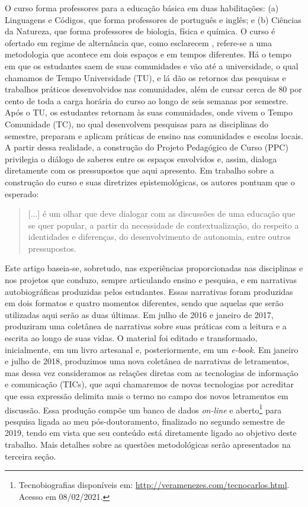 \documentclass{textolivre}
\begin{document}
O curso forma professores para a educação básica em duas habilitações: (a) Linguagens e Códigos, que forma professores de português e inglês; e (b) Ciências da Natureza, que forma professores de biologia, física e química. O curso é ofertado em regime de alternância que, como esclarecem \textcite{magnani_da_2018}, refere-se a uma metodologia que acontece em dois espaços e em tempos diferentes. Há o tempo em que os estudantes saem de suas comunidades e vão até a universidade, o qual chamamos de Tempo Universidade (TU), e lá dão os retornos das pesquisas e trabalhos práticos desenvolvidos nas comunidades, além de cursar cerca de 80 por cento de toda a carga horária do curso ao longo de seis semanas por semestre. Após o TU, os estudantes retornam às suas comunidades, onde vivem o Tempo Comunidade (TC), no qual desenvolvem pesquisas para as disciplinas do semestre, preparam e aplicam práticas de ensino nas comunidades e escolas locais. A partir dessa realidade, a construção do Projeto Pedagógico de Curso (PPC) privilegia o diálogo de saberes entre os espaços envolvidos e, assim, dialoga diretamente com os pressupostos que aqui apresento. Em trabalho sobre a construção do curso e suas diretrizes epistemológicas, os autores pontuam que o esperado:

\begin{quote}
    [...] é um olhar que deve dialogar com as discussões de uma educação que se quer popular, a partir da necessidade de contextualização, do respeito a identidades e diferenças, do desenvolvimento de autonomia, entre outros pressupostos. \cite[p. 67]{magnani_da_2018}
\end{quote}

Este artigo baseia-se, sobretudo, nas experiências proporcionadas nas disciplinas e nos projetos que conduzo, sempre articulando ensino e pesquisa, e em narrativas autobiográficas produzidas pelos estudantes. Essas narrativas foram produzidas em dois formatos e quatro momentos diferentes, sendo que aquelas que serão utilizadas aqui serão as duas últimas. Em julho de 2016 e janeiro de 2017,  produziram uma coletânea de narrativas sobre suas práticas com a leitura e a escrita ao longo de suas vidas. O material foi editado e transformado, inicialmente, em um livro artesanal e, posteriormente, em um \textit{e-book}. Em janeiro e julho de 2018, produzimos uma nova coletânea de narrativas de letramentos, mas dessa vez consideramos as relações diretas com as tecnologias de informação e comunicação (TICs), que aqui chamaremos de novas tecnologias por acreditar que essa expressão delimita mais o termo no campo dos novos letramentos em discussão. Essa produção compõe um banco de dados \textit{on-line} e aberto\footnote{Tecnobiografias disponíveis em: \url{http://veramenezes.com/tecnocarlos.html}. Acesso em 08/02/2021.} para pesquisa ligada ao meu pós-doutoramento, finalizado no segundo semestre de 2019, tendo em vista que seu conteúdo está diretamente ligado ao objetivo deste trabalho. Mais detalhes sobre as questões metodológicas serão apresentados na terceira seção.
\end{document}

